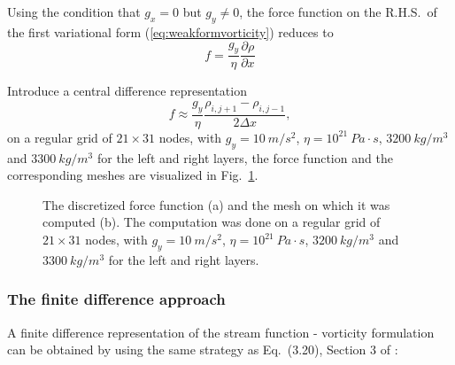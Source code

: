 \documentclass[12pt]{article}
\numberwithin{figure}{section}  %
\numberwithin{equation}{section}  %
\begin{document}
\begin{multicols}{2}
Using the condition that $g_x=0$ but $g_y\neq0$, the force function on the R.H.S.\ of the first variational form (\ref{eq:weakformvorticity}) reduces to
\begin{equation}\label{eq:forcefunction}
    f = \dfrac{g_y}{\eta}\dfrac{\partial\rho}{\partial{x}}
\end{equation}

Introduce a central difference representation
\begin{equation}\label{eq:forcefunctionnumerical}
    f \approx \dfrac{g_y}{\eta}\dfrac{\rho_{i,j+1}-\rho_{i,j-1}}{2\Delta{x}},
\end{equation}
on a regular grid of $21\times31$ nodes, with $g_y=10\ m/s^2$, $\eta=10^{21}\ Pa\cdot{s}$, $3200\ kg/m^3$ and $3300\ kg/m^3$ for the left and right layers, the force function and the corresponding meshes are visualized in Fig.\ \ref{fig:forcefunction}.
\begin{figure}[!htb]
	\centering
	\caption{The discretized force function (a) and the mesh on which it was computed (b). The computation was done on a regular grid of $21\times31$ nodes, with $g_y=10\ m/s^2$, $\eta=10^{21}\ Pa\cdot{s}$, $3200\ kg/m^3$ and $3300\ kg/m^3$ for the left and right layers.}
	\label{fig:forcefunction}
\end{figure}

\subsubsection{The finite difference approach}

A finite difference representation of the stream function - vorticity formulation can be obtained by using the same strategy as Eq.\ (3.20), Section 3 of \citet{gerya2009introduction}:
\end{multicols}
\end{document}
